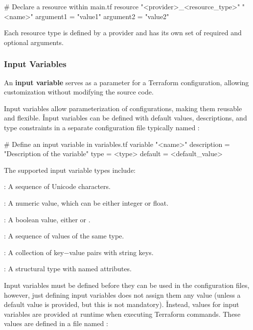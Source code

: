 \begin{block}
# Declare a resource within main.tf
resource "<provider>_<resource_type>" "<name>" {
    argument1 = "value1"
    argument2 = "value2"
}
\end{block}

Each resource type is defined by a provider and has its own set of required and optional arguments.

\subsubsection{Input Variables}

An \textbf{input variable} serves as a parameter for a Terraform configuration, allowing customization without modifying
the source code.
\ed

Input variables allow parameterization of configurations, making them reusable and flexible. \v

Input variables can be defined with default values, descriptions, and type constraints in a separate configuration file
typically named :

\begin{block}
# Define an input variable in variables.tf
variable "<name>" {
    description = "Description of the variable"
    type = <type>
    default = <default_value>
}
\end{block}

The supported input variable types include:
\bit
\item {}: A sequence of Unicode characters.
\item {}: A numeric value, which can be either integer or float.
\item {}: A boolean value, either  or .
\item {}: A sequence of values of the same type.
\item {}: A collection of key$-$value pairs with string keys.
\item {}: A structural type with named attributes.
\eit

Input variables must be defined before they can be used in the configuration files, however, just defining input
variables does not assign them any value (unless a default value is provided, but this is not mandatory).
\v

Instead, values for input variables are provided at runtime when executing Terraform commands. These values are defined
in a file named :

